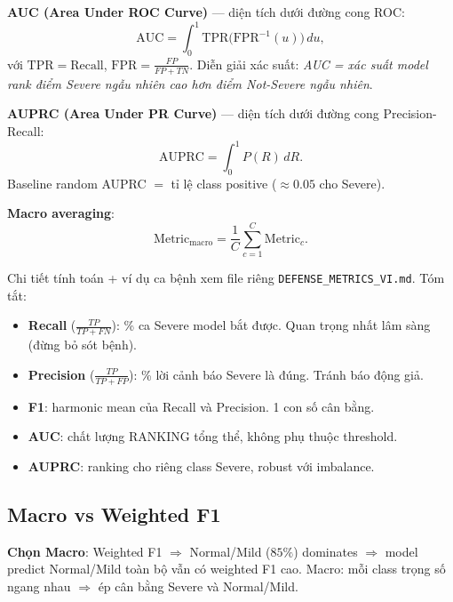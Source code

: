 \documentclass[11pt,a4paper]{article}
\begin{document}
\textbf{AUC (Area Under ROC Curve)} --- diện tích dưới đường cong ROC:
\begin{equation}
\mathrm{AUC} = \int_{0}^{1} \mathrm{TPR}\!\big(\mathrm{FPR}^{-1}(u)\big)\,du,
\label{eq:auc_vi}
\end{equation}
với $\mathrm{TPR} = \mathrm{Recall}$,
$\mathrm{FPR} = \frac{FP}{FP + TN}$. Diễn giải xác suất:
\emph{AUC = xác suất model rank điểm Severe ngẫu nhiên cao hơn điểm
Not-Severe ngẫu nhiên}.

\textbf{AUPRC (Area Under PR Curve)} --- diện tích dưới đường cong
Precision-Recall:
\begin{equation}
\mathrm{AUPRC} = \int_{0}^{1} P(R)\,dR.
\label{eq:auprc_vi}
\end{equation}
Baseline random AUPRC $=$ tỉ lệ class positive
($\approx 0.05$ cho Severe).

\textbf{Macro averaging}:
\begin{equation}
\mathrm{Metric}_{\text{macro}}
= \frac{1}{C} \sum_{c=1}^{C} \mathrm{Metric}_c.
\label{eq:macro_vi}
\end{equation}

\noindent Chi tiết tính toán + ví dụ ca bệnh xem file riêng
\texttt{DEFENSE\_METRICS\_VI.md}. Tóm tắt:

\begin{itemize}[leftmargin=*]
\item \textbf{Recall} ($\frac{TP}{TP+FN}$): \% ca Severe model bắt
được. Quan trọng nhất lâm sàng (đừng bỏ sót bệnh).
\item \textbf{Precision} ($\frac{TP}{TP+FP}$): \% lời cảnh báo Severe
là đúng. Tránh báo động giả.
\item \textbf{F1}: harmonic mean của Recall và Precision. 1 con số cân bằng.
\item \textbf{AUC}: chất lượng RANKING tổng thể, không phụ thuộc threshold.
\item \textbf{AUPRC}: ranking cho riêng class Severe, robust với imbalance.
\end{itemize}

\subsection{Macro vs Weighted F1}

\noindent\textbf{Chọn Macro}: Weighted F1 $\Rightarrow$ Normal/Mild
($85\%$) dominates $\Rightarrow$ model predict Normal/Mild toàn bộ vẫn
có weighted F1 cao. Macro: mỗi class trọng số ngang nhau $\Rightarrow$
ép cân bằng Severe và Normal/Mild.
\end{document}

